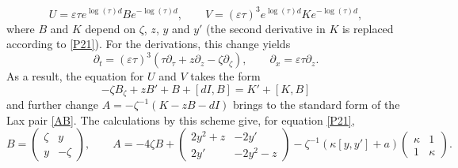 \documentclass{article}
\theoremstyle{plain}
\theoremstyle{definition}
\begin{document}
\[
 U=\varepsilon\tau e^{\log(\tau)d}Be^{-\log(\tau)d},\qquad V=(\varepsilon\tau)^3e^{\log(\tau)d}Ke^{-\log(\tau)d},
\]
where $B$ and $K$ depend on $\zeta$, $z$, $y$ and $y'$ (the second derivative in $K$ is replaced according to \ref{P21}).  For the derivations, this change yields
\[
 \partial_t=(\varepsilon\tau)^3(\tau\partial_\tau+z\partial_z-\zeta\partial_\zeta),\qquad
 \partial_x=\varepsilon\tau\partial_z.
\]
As a result, the equation for $U$ and $V$ takes the form
\[
 -\zeta B_\zeta+zB'+B+[dI,B]=K'+[K,B]
\]
and further change $A=-\zeta^{-1}(K-zB-dI)$ brings to the standard form of the Lax pair \eqref{AB}. The calculations by this scheme give, for equation \ref{P21},
\[
 B=\begin{pmatrix}
  \zeta & y\\
  y & -\zeta
 \end{pmatrix},\qquad
 A= -4\zeta B +\begin{pmatrix}
  2y^2+z & -2y'\\
  2y' & -2y^2-z
 \end{pmatrix}
 -\zeta^{-1}(\kappa[y,y']+a)
 \begin{pmatrix} \kappa & 1\\ 1 &\kappa \end{pmatrix}.
\]
\end{document}
